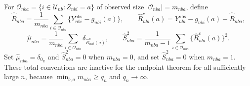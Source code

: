 For \(\mathcal O_{nba}=\{i\in\mathcal U_{nb}:Z_{nbi}=a\}\) of observed size \(|\mathcal O_{nba}|=m_{nba}\), define
\[
\widehat{\bar R}_{nba}=\frac1{m_{nba}}\sum_{i\in\mathcal O_{nba}}\{Y_{nbi}^{\mathrm{obs}}-g_{nbi}(a)\},\qquad \widehat R_{nbi}^{c}(a)=Y_{nbi}^{\mathrm{obs}}-g_{nbi}(a)-\widehat{\bar R}_{nba},
\]
\[
\widehat\mu_{nba}=\frac1{m_{nba}}\sum_{i\in\mathcal O_{nba}}\delta_{\widehat R_{nbi}^{c}(a)},\qquad \widehat S_{nba}^2=\frac1{m_{nba}-1}\sum_{i\in\mathcal O_{nba}}\{\widehat R_{nbi}^{c}(a)\}^2.
\]
Set \(\widehat\mu_{nba}=\delta_{0_{\mathbb R}}\) and \(\widehat S_{nba}^2=0\) when \(m_{nba}=0\), and set \(\widehat S_{nba}^2=0\) when \(m_{nba}=1\). These total conventions are inactive for the endpoint theorem for all sufficiently large \(n\), because \(\min_{b,a}m_{nba}\ge q_n\) and \(q_n\to\infty\).
